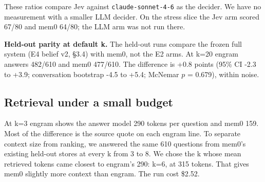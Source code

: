 \documentclass[11pt]{article}
\newcommand{\src}[1]{}
\begin{document}
These ratios compare Jev against \texttt{claude-sonnet-4-6} as the decider. We have no measurement with a smaller LLM decider. On the stress slice the Jev arm scored 67/80\src{bench/results/e2_jev__stress.json} and mem0 64/80\src{bench/results/mem0__stress.json}; the LLM arm was not run there.

\textbf{Held-out parity at default k.} The held-out runs compare the frozen full system (E4 belief v2, \S{}3.4) with mem0, not the E2 arms. At k=20 engram answers 482/610\src{bench/results/heldout_report.json} and mem0 477/610\src{bench/results/heldout_report.json}. The difference is +0.8\src{bench/results/heldout_report.json} points (95\% CI -2.3\src{bench/results/heldout_report.json} to +3.9\src{bench/results/heldout_report.json}; conversation bootstrap -4.5\src{bench/results/heldout_report.json} to +5.4\src{bench/results/heldout_report.json}; McNemar $p$ = 0.679\src{bench/results/heldout_report.json}), within noise.

\subsection{Retrieval under a small budget}
At k=3 engram shows the answer model 290\src{bench/results/heldout_report.json} tokens per question and mem0 159\src{bench/results/heldout_report.json}. Most of the difference is the source quote on each engram line. To separate context size from ranking, we answered the same 610\src{bench/results/heldout_report.json} questions from mem0's existing held-out stores at every k from 3 to 8. We chose the k whose mean retrieved tokens came closest to engram's 290\src{bench/results/mem0_token_matched__heldout_pooled__k6.json}: k=6\src{bench/results/mem0_token_matched__heldout_pooled__k6.json}, at 315\src{bench/results/mem0_token_matched__heldout_pooled__k6.json} tokens. That gives mem0 slightly more context than engram. The run cost \$2.52\src{bench/results/mem0_token_matched__heldout_pooled__k6.json}.
\end{document}
